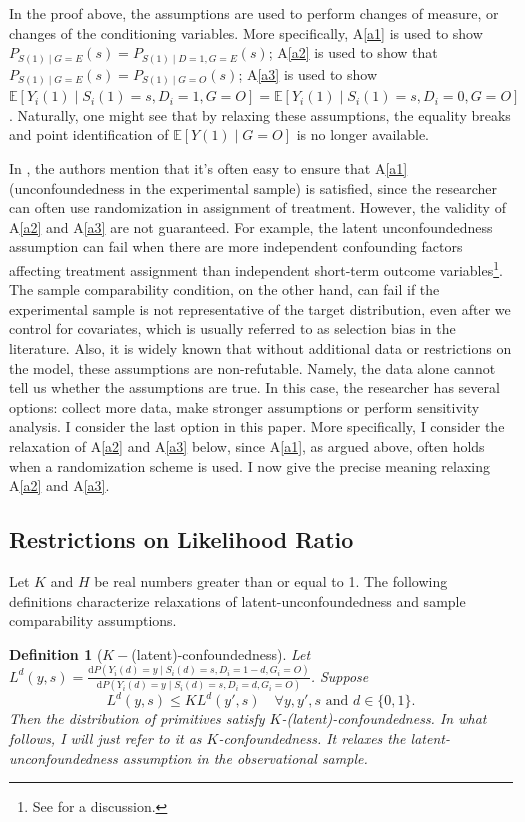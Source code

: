 \documentclass[12pt]{article}
\newtheorem{defn}{Definition}
\newcommand{\Ep}{\mathbb{E}}
\begin{document}
	In the proof above, the assumptions are used to perform changes of measure, or changes of the conditioning variables. More specifically, A\ref{a1} is used to show $P_{S(1) \mid G = E}(s) = P_{S(1) \mid D = 1, G= E}(s)$; A\ref{a2} is used to show that $P_{S(1) \mid G = E}(s) = P_{S(1) \mid G = O}(s)$; A\ref{a3} is used to show $ \mathbb{E}[Y_i(1) \mid S_i(1) = s, D_i = 1, G = O] = \mathbb{E}[Y_i(1) \mid S_i(1) = s, D_i = 0, G = O]$. Naturally, one might see that by relaxing these assumptions, the equality breaks and point identification of $\Ep[Y(1) \mid G = O]$ is no longer available.
	
	In \textcite{athey2020combining}, the authors mention that it's often easy to ensure that A\ref{a1}(unconfoundedness in the experimental sample) is satisfied, since the researcher can often use randomization in assignment of treatment. However, the validity of A\ref{a2} and A\ref{a3} are not guaranteed. For example, the latent unconfoundedness assumption can fail when there are more independent confounding factors affecting treatment assignment than independent short-term outcome variables\footnote{See \textcite{athey2020combining} for a discussion.}. The sample comparability condition, on the other hand, can fail if the experimental sample is not representative of the target distribution, even after we control for covariates, which is usually referred to as selection bias in the literature. Also, it is widely known that without additional data or restrictions on the model, these assumptions are non-refutable. Namely, the data alone cannot tell us whether the assumptions are true. In this case, the researcher has several options: collect more data, make stronger assumptions or perform sensitivity analysis. I consider the last option in this paper. More specifically, I consider the relaxation of A\ref{a2} and A\ref{a3} below, since A\ref{a1}, as argued above, often holds when a randomization scheme is used. I now give the precise meaning relaxing A\ref{a2} and A\ref{a3}. 
	
	\subsection{Restrictions on Likelihood Ratio}
	Let $K$ and $H$ be real numbers greater than or equal to 1. The following definitions characterize relaxations of latent-unconfoundedness and sample comparability assumptions.
	
	\begin{defn}[$K-$(latent)-confoundedness] Let $L^d(y,s) = \frac{\mathrm{d} P(Y_i(d) = y \mid S_i(d) = s, D_i =1-d, G_i = O)}{\mathrm{d} P(Y_i(d) = y \mid S_i(d) = s, D_i = d, G_i = O)}$. Suppose $$L^d(y,s) \leq K L^d(y',s) \quad \forall y,y',s \text{ and } d\in\{0,1\}.$$ Then the distribution of primitives satisfy $K$-(latent)-confoundedness. In what follows, I will just refer to it as $K$-confoundedness. It relaxes the latent-unconfoundedness assumption in the observational sample.
	\end{defn}
	
\end{document}
